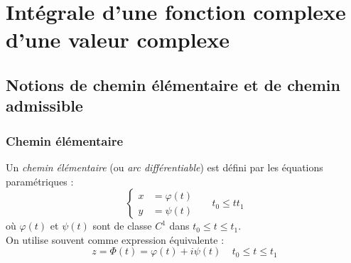\section{Intégrale d'une fonction complexe d'une valeur complexe}
    \subsection{Notions de chemin élémentaire et de chemin admissible}
        \subsubsection{Chemin élémentaire}
    Un \textit{chemin élémentaire} (ou \textit{arc différentiable}) est défini par les équations
    paramétriques :
    \begin{equation}
    \left\{\begin{array}{ll}
    x &= \varphi(t)  \\
    y &= \psi(t) 
    \end{array}\right.\ \ \ \ \ \ \ t_0\leq t t_1
    \end{equation}
    où $\varphi(t)$ et $\psi(t)$ sont de classe $C^1$ dans $t_0 \leq t\leq t_1$.\\
    On utilise souvent comme expression équivalente : 
    \begin{equation}
    z = \Phi(t) = \varphi(t) + i\psi(t)\ \ \ \ \ t_0 \leq t\leq t_1
    \end{equation}
    
    
